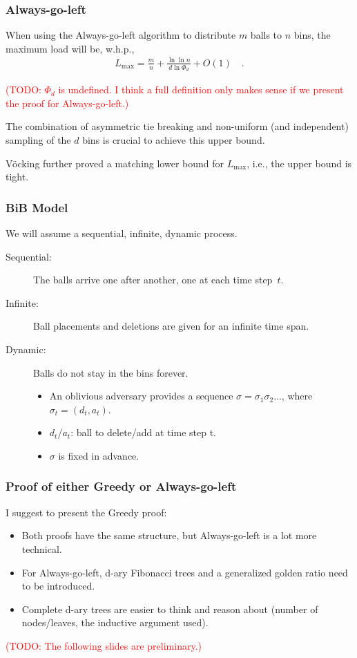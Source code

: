 \documentclass[serif,professionalfonts]{beamer}
\newcommand\todo[1]{\textcolor{red}{(TODO: #1)}}
\newcommand\load{L_{\mathrm{max}}}
\begin{document}
\begin{frame}
\frametitle{Always-go-left}
\begin{theorem}[V\"ocking, 2003]
When using the \alert{Always-go-left} algorithm to distribute $m$ balls to $n$ bins, the maximum load will be, w.h.p.,
\begin{align*}
\load = \frac{m}{n} + \frac{\ln \ln n}{d \ln \Phi_d} + O(1) \quad .
\end{align*}
\end{theorem}
\todo{$\Phi_d$ is undefined. I think a full definition only makes sense if we present the proof for Always-go-left.}

\pause
\bigskip
The combination of \alert{asymmetric tie breaking} and \alert{non-uniform} (and independent) sampling of the $d$ bins is crucial to achieve this upper bound.

\medskip
V\"ocking further proved a matching lower bound for $\load$, i.e., the upper bound is tight.
\end{frame}

\begin{frame}
\frametitle{BiB Model}
We will assume a sequential, infinite, dynamic process.

\begin{description}
\item[\alert{Sequential:}] The balls arrive one after another, one at each time step~$t$.
\item[\alert{Infinite:}] Ball placements and deletions are given for an infinite time span.
\item[\alert{Dynamic:}] Balls do not stay in the bins forever.
\begin{itemize}
\item An oblivious adversary provides a sequence $\sigma = \sigma_1 \sigma_2 \dots$, where $\sigma_t = (d_t, a_t)$.
\item $d_t$/$a_t$: ball to delete/add at time step t. \\
\item $\sigma$ is fixed in advance.
\end{itemize}
\end{description}
\end{frame}

\begin{frame}
\frametitle{Proof of either Greedy or Always-go-left}
I suggest to present the Greedy proof:
\begin{itemize}
\item Both proofs have the same structure, but Always-go-left is a lot more technical.
\item For Always-go-left, d-ary Fibonacci trees and a generalized golden ratio need to be introduced.
\item Complete d-ary trees are easier to think and reason about (number of nodes/leaves, the inductive argument used).
\end{itemize}
\todo{The following slides are preliminary.}
\end{frame}
\end{document}
